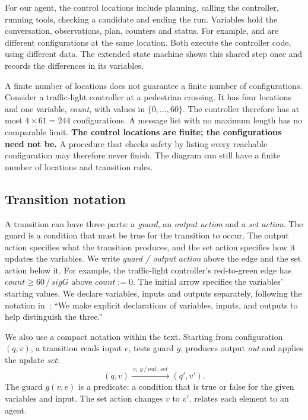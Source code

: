 For our agent, the control locations include planning, calling the controller, running tools,
checking a candidate and ending the run. Variables hold the conversation, observations, plan,
counters and status. For example,  and
 are different configurations at the same location.
Both execute the controller code, using different data. The extended state machine shows this
shared step once and records the differences in its variables.

A finite number of locations does not guarantee a finite number of configurations. Consider a
traffic-light controller at a pedestrian crossing. It has four locations and one variable,
\emph{count}, with values in $\{0, \ldots, 60\}$. The controller therefore has at most
$4 \times 61 = 244$ configurations. A message list with no maximum length has no comparable
limit. \textbf{The control locations are finite; the configurations need not be.} A procedure
that checks safety by listing every reachable configuration may therefore never finish. The
diagram can still have a finite number of locations and transition rules.

\subsection{Transition notation}
\label{sec:efsm-notation}

A transition can have three parts: a \emph{guard}, an \emph{output action} and a \emph{set action}.
The guard is a condition that must be true for the transition to occur. The output action
specifies what the transition produces, and the set action specifies how it updates the
variables. We write \emph{guard / output action} above the edge and the set action below it.
For example, the traffic-light controller's red-to-green edge has
$\mathit{count} \geq 60 \,/\, \mathit{sigG}$ above $\mathit{count} := 0$.
The initial arrow specifies the variables' starting values. We declare variables, inputs and
outputs separately, following the notation in~\citet[slides~5--6]{seshia2015extended}: ``We make explicit declarations of variables, inputs,
and outputs to help distinguish the three.''

We also use a compact notation within the text. Starting from configuration $(q, v)$, a
transition reads input $e$, tests guard $g$, produces output \emph{out} and applies the update
\emph{set}:
\[
  (q, v) \xrightarrow{\;e;\ g\ /\ \mathit{out};\ \mathit{set}\;} (q', v').
\]
The guard $g(v, e)$ is a predicate: a condition that is true or false for the given variables and
input. The set action changes $v$ to $v'$.  relates each element to an agent.

